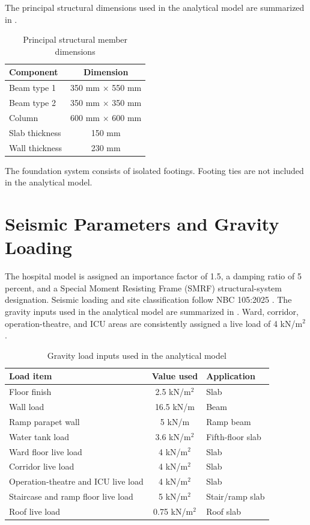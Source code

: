 The principal structural dimensions used in the analytical model are summarized in .
\begin{table}[htbp]
\caption{Principal structural member dimensions}
\label{tab:member_dimensions_methodology}
\centering
\begin{tabular}{lc}
\hline\hline
Component & Dimension \\ \hline
Beam type 1 & 350 mm $\times$ 550 mm \\
Beam type 2 & 350 mm $\times$ 350 mm \\
Column & 600 mm $\times$ 600 mm \\
Slab thickness & 150 mm \\
Wall thickness & 230 mm \\ \hline\hline
\end{tabular}
\end{table}

The foundation system consists of isolated footings. Footing ties are not included in the analytical model.

\section{Seismic Parameters and Gravity Loading}
The hospital model is assigned an importance factor of 1.5, a damping ratio of 5 percent, and a Special Moment Resisting Frame (SMRF) structural-system designation. Seismic loading and site classification follow NBC 105:2025 \cite{nbc1052025}. The gravity inputs used in the analytical model are summarized in . Ward, corridor, operation-theatre, and ICU areas are consistently assigned a live load of 4 kN/m$^2$.

\begin{table}[htbp]
\caption{Gravity load inputs used in the analytical model}
\label{tab:gravity_loads_methodology}
\centering
\begin{tabular}{lcl}
\hline\hline
Load item & Value used & Application \\ \hline
Floor finish & 2.5 kN/m$^2$ & Slab \\
Wall load & 16.5 kN/m & Beam \\
Ramp parapet wall & 5 kN/m & Ramp beam \\
Water tank load & 3.6 kN/m$^2$ & Fifth-floor slab \\
Ward floor live load & 4 kN/m$^2$ & Slab \\
Corridor live load & 4 kN/m$^2$ & Slab \\
Operation-theatre and ICU live load & 4 kN/m$^2$ & Slab \\
Staircase and ramp floor live load & 5 kN/m$^2$ & Stair/ramp slab \\
Roof live load & 0.75 kN/m$^2$ & Roof slab \\ \hline\hline
\end{tabular}
\end{table}

